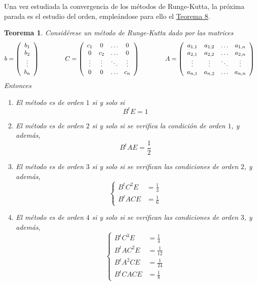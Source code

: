 \documentclass[11pt]{report}
\theoremstyle{mytheorem}
\newtheorem{theorem}{Teorema}
\theoremstyle{mydefinition}
\theoremstyle{myexample}
\newenvironment{ctheorem} %
  {\begin{mdframed}[
        linewidth=3pt,
        linecolor=c2,
        bottomline=false,
        topline=false,
        rightline=false,
        innerrightmargin=0pt,
        innertopmargin=0pt,
        innerbottommargin=0pt,
        innerleftmargin=1em, %
        skipabove=\baselineskip]
    \begin{theorem}}
  {\end{theorem}\end{mdframed}}
\newcommand{\pars}[1]{\left( #1 \right)}
\begin{document}
Una vez estudiada la convergencia de los métodos de Runge-Kutta, la próxima parada es el estudio del orden, empleándose para ello el \hyperref[teo2.17]{\color{gray}Teorema 8}.
\begin{ctheorem}
Considérese un método de Runge-Kutta dado por las matrices
\[b = \pars{\begin{array}{c}
     b_1 \\
     b_2 \\
     \vdots \\
     b_n
\end{array}} \qquad \qquad C = \left(\begin{array}{cccc}
    c_1 & 0 & \mathellipsis & 0 \\
    0 & c_2 & \mathellipsis & 0 \\
    \vdots & \vdots & \ddots & \vdots \\
    0 & 0 & \mathellipsis & c_n \\
\end{array}\right) \qquad \qquad A = \left(\begin{array}{cccc}
    a_{1,1} & a_{1,2} & \mathellipsis & a_{1,n} \\
    a_{2,1} & a_{2,2} & \mathellipsis & a_{2,n} \\
    \vdots & \vdots & \ddots & \vdots \\
    a_{n,1} & a_{n,2} & \mathellipsis & a_{n,n} \\
\end{array}\right) \]
Entonces
\begin{enumerate}
    \item El método es de orden $1$ si y solo si
    \[B^tE = 1\]
    \item El método es de orden $2$ si y solo si se verifica la condición de orden $1$, y además,
    \[
        B^tAE = \frac{1}{2}
    \]
    \item El método es de orden $3$ si y solo si se verifican las condiciones de orden $2$, y además,
    \[\left\{\begin{alignedat}{1}
        B^tC^2E &= \frac{1}{3} \\[5pt]
        B^tACE &= \frac{1}{6}
    \end{alignedat}\right.\]
    \item El método es de orden $4$ si y solo si se verifican las condiciones de orden $3$, y además,
    \[\left\{\begin{alignedat}{1}
        B^tC^3E &=\frac{1}{4} \\[5pt]
        B^tAC^2E &=\frac{1}{12} \\[5pt]
        B^tA^2CE &= \frac{1}{24} \\[5pt]
        B^tCACE &= \frac{1}{8}
    \end{alignedat}\right.\]
\end{enumerate}
\end{ctheorem}
\end{document}
